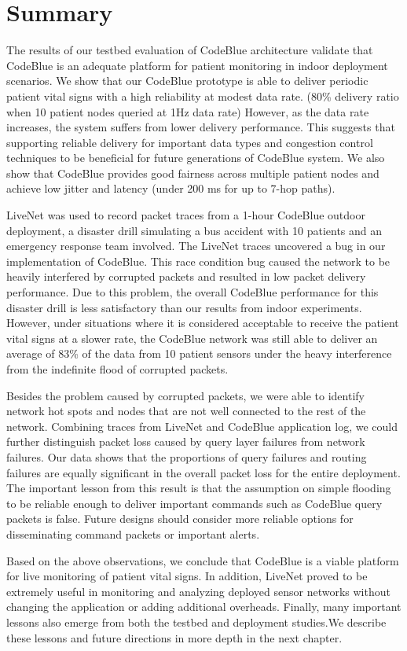\section{Summary}

The results of our testbed evaluation of CodeBlue architecture validate that
CodeBlue is an adequate platform for patient monitoring in indoor deployment
scenarios. We show that our CodeBlue prototype is able to deliver periodic
patient vital signs with a high reliability at modest data rate. (80\%
delivery ratio when 10 patient nodes queried at 1Hz data rate) However, as the
data rate increases, the system suffers from lower delivery performance. This
suggests that supporting reliable delivery for important data types and
congestion control techniques to be beneficial for future generations of
CodeBlue system. We also show that CodeBlue provides good fairness across
multiple patient nodes and achieve low jitter and latency (under 200 ms for up
to 7-hop paths).

LiveNet was used to record packet traces from a 1-hour CodeBlue outdoor
deployment, a disaster drill simulating a bus accident with 10 patients and an
emergency response team involved.  The LiveNet traces uncovered a bug in our
implementation of CodeBlue. This race condition bug caused the network to be
heavily interfered by corrupted packets and resulted in low packet delivery
performance. Due to this problem, the overall CodeBlue performance for this
disaster drill is less satisfactory than our results from indoor experiments.
However, under situations where it is considered acceptable to receive the
patient vital signs at a slower rate, the CodeBlue network was still able to
deliver an average of 83\% of the data from 10 patient sensors under the heavy
interference from the indefinite flood of corrupted packets. 

Besides the problem caused by corrupted packets, we were able to
identify network hot spots and nodes that are not well connected to the rest
of the network. Combining traces from LiveNet and CodeBlue application log, we
could further distinguish packet loss caused by query layer failures from
network failures. Our data shows that the proportions of query failures and
routing failures are equally significant in the overall packet loss for the
entire deployment. The important lesson from this result is that the
assumption on simple flooding to be reliable enough to deliver important
commands such as CodeBlue query packets is false. Future designs should
consider more reliable options for disseminating command packets or important
alerts. 

Based on the above observations, we conclude that CodeBlue is a viable
platform for live monitoring of patient vital signs. In addition, 
LiveNet proved to be extremely useful in monitoring and analyzing
deployed sensor networks without changing the application or adding additional
overheads. Finally, many important lessons also emerge from both the
testbed and deployment studies.We describe these lessons 
and future directions in more depth in the next chapter.

